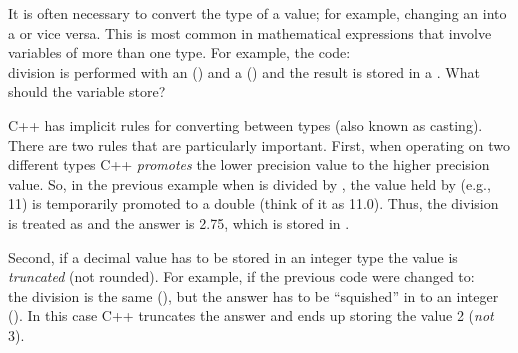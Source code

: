 It is often necessary to convert the type of a value; for example, changing an  into a  or vice versa.  This is most common in mathematical expressions that involve variables of more than one type.   For example, the code:\\
division is performed with an  () and a  () and the result is stored in a .  What should the variable  store?

C++ has implicit rules for converting between types (also known as casting).  There are two rules that are particularly important.  First, when operating on two different types C++ \emph{promotes} the lower precision value to the higher precision value.  So, in the previous example when  is divided by , the value held by  (e.g., 11) is temporarily promoted to a double (think of it as 11.0).  Thus, the division is treated as  and the answer is 2.75, which is stored in .

Second, if a decimal value has to be stored in an integer type the value is \emph{truncated} (not rounded).  For example, if the previous code were changed to:\\
the division is the same (), but the answer has to be ``squished'' in to an integer ().  In this case C++ truncates the answer and  ends up storing the value 2 (\emph{not} 3).

